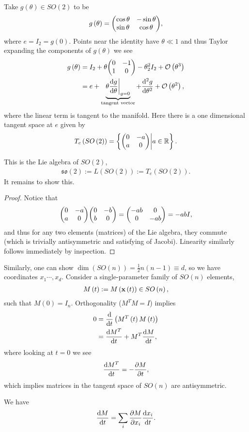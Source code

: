 Take $ g\left( \theta \right) \in SO \left( 2 \right) $ to be
\begin{align}
    g\left( \theta \right) = \mqty( \cos \theta & - \sin \theta \\ \sin \theta & \cos \theta)
,\end{align}
where $e = I_2 = g\left( 0 \right) $. Points near the identity have $\theta \ll 1$ and thus Taylor expanding the components of $g\left( \theta \right) $ we see
\begin{align}
    g \left( \theta \right) &= I_2 + \theta \mqty ( 0 & -1 \\ 1 & 0 ) - \theta^2_2 I_2 + \mathcal{O}\left( \theta^3 \right) \\
                            &= e + \underbrace{\theta \dv{g}{\theta} \bigg|_{g = 0}}_{\text{tangent vector}} + \dv[2]{g}{\theta} + \mathcal{O}\left( \theta^2 \right)
,\end{align}
where the linear term is tangent to the manifold. Here there is a one dimensional tangent space at $e$ given by
\begin{align}
    T_e \left( SO \left( 2 \right)  \right) = \left\{ \mqty( 0 & -a \\ a & 0 ) \bigg| a \in \R \right\} 
.\end{align}

This is the Lie algebra of $SO \left( 2 \right) $,
\begin{align}
    \mathfrak{so}\left( 2 \right) :=  L \left( SO \left( 2 \right)  \right) := T_e \left( SO \left( 2 \right)  \right) 
.\end{align}
It remains to show this.
\begin{proof}
    Notice that
    \begin{align}
        \mqty( 0 & -a \\ a & 0 ) \mqty( 0 & -b \\ b & 0) = \mqty( -ab & 0 \\ 0 & -ab) = -ab I
    ,\end{align}
    and thus for any two elements (matrices) of the Lie algebra, they commute (which is trivially antisymmetric and satisfying of Jacobi). Linearity similarly follows immediately by inspection.
\end{proof}

Similarly, one can show $\dim \left( SO \left( n \right)  \right) = \frac{1}{2} n \left( n - 1 \right) \equiv d $, so we have coordinates $x_1 \cdots, x_d$. Consider a single-parameter family of $SO\left( n \right) $ elements,
\begin{align}
    M\left( t \right) := M\left( \vb{x}\left( t \right)  \right) \in SO \left( n \right) 
,\end{align}
such that $M\left( 0 \right) = I_n$. Orthogonality ($M^{T} M = I$) implies
\begin{align}
    0 &= \dv{t} \left( M^{T}\left( t \right) M\left( t \right)  \right) \\
    &= \dv{M^{T}}{t} + M^{T} \dv{M}{t}
,\end{align}
where looking at $t = 0$ we see
\begin{align}
    \dv{M^{T}}{t} = -\pdv{M}{t}
,\end{align}
which implies matrices in the tangent space of $SO \left( n \right) $ are antisymmetric.

We have
\begin{align}
    \dv{M}{t} = \sum_{i}^{} \pdv{M}{x_{i}} \dv{x_{i}}{t} 
.\end{align}





